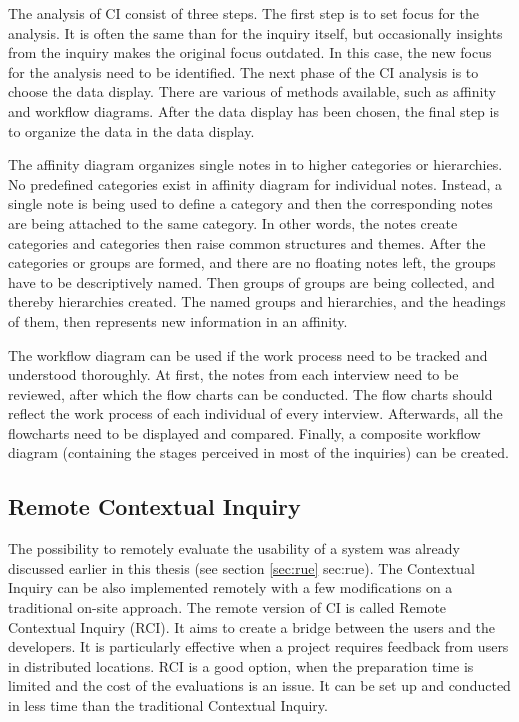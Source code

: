\documentclass[12pt,a4paper,oneside,pdftex]{report}
\begin{document}
The analysis of CI consist of three steps. The first step is to set focus for the analysis. It is often the same than for the inquiry itself, but occasionally insights from the inquiry makes the original focus outdated. In this case, the new focus for the analysis need to be identified. The next phase of the CI analysis is to choose the data display. There are various of methods available, such as affinity and workflow diagrams. After the data display has been chosen, the final step is to organize the data in the data display. \cite{RefWorks:28}

The affinity diagram organizes single notes in to higher categories or hierarchies. No predefined categories exist in affinity diagram for individual notes. Instead, a single note is being used to define a category and then the corresponding notes are being attached to the same category. In other words, the notes create categories and categories then raise common structures and themes. After the categories or groups are formed, and there are no floating notes left, the groups have to be descriptively named. Then groups of groups are being collected, and thereby hierarchies created. The named groups and hierarchies, and the headings of them, then represents new information in an affinity. \cite{RefWorks:21, RefWorks:28}

The workflow diagram can be used if the work process need to be tracked and understood thoroughly. At first, the notes from each interview need to be reviewed, after which the flow charts can be conducted. The flow charts should reflect the work process of each individual of every interview. Afterwards, all the flowcharts need to be displayed and compared. Finally, a composite workflow diagram (containing the stages perceived in most of the inquiries) can be created. \cite{RefWorks:28}

\subsection{Remote Contextual Inquiry}
The possibility to remotely evaluate the usability of a system was already discussed earlier in this thesis (see section \ref{sec:rue} \refname{sec:rue}). The Contextual Inquiry can be also implemented remotely with a few modifications on a traditional on-site approach. The remote version of CI is called Remote Contextual Inquiry (RCI). It aims to create a bridge between the users and the developers. It is particularly effective when a project requires feedback from users in distributed locations. RCI is a good option, when the preparation time is limited and the cost of the evaluations is an issue. It can be set up and conducted in less time than the traditional Contextual Inquiry. \cite{RefWorks:32}
\end{document}
